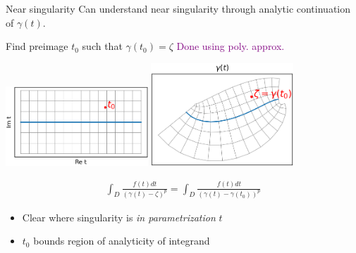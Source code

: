 \documentclass[t]{beamer}
\newcommand{\com}[1]{{\scriptsize \textcolor{purple}{#1}}}      %
\newcommand{\sg}{\vspace{1ex}}
\begin{document}
\begin{frame}{Near singularity}
  Can understand near singularity through analytic
  continuation of $\gamma(t)$.

  \sg
  Find preimage $t_0$ such that $\gamma(t_0) = \zeta$ \hfill\com{Done using poly. approx.}
   \begin{center}
    \includegraphics[width=0.4\textwidth]{fig/complexification_t_case2.png}
    \hspace{1em} 
    \includegraphics[width=0.4\textwidth]{fig/complexification_gamma_case2.png}
  \end{center}
  \begin{align}
    \int_D \frac{f(t) dt }{(\gamma(t)-\zeta)^p}
    = \int_D \frac{f(t) dt }{(\gamma(t)-\gamma(t_0))^p} 
  \end{align}
  \begin{itemize}
  \item Clear where singularity is \emph{in parametrization} $t$
  \item $t_0$ bounds region of analyticity of integrand
  \end{itemize}
\end{frame}
\end{document}

